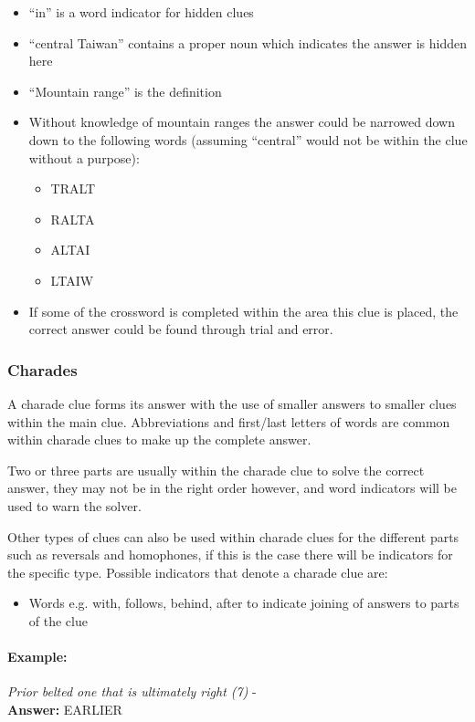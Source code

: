 \begin{itemize}
  \item ``in'' is a word indicator for hidden clues 
  \item ``central Taiwan'' contains a proper noun which indicates the answer 
        is hidden here 
  \item ``Mountain range'' is the definition 
  \item Without knowledge of mountain ranges the answer could be narrowed down
        down to the following words (assuming ``central'' would not be within 
        the clue without a purpose):
  \begin{itemize}
    \item TRALT 
    \item RALTA 
    \item ALTAI 
    \item LTAIW
  \end{itemize} 
  \item If some of the crossword is completed within the area this clue is 
        placed, the correct answer could be found through trial and error.
\end{itemize}


\subsubsection{Charades}

A charade clue forms its answer with the use of smaller answers to smaller clues
within the main clue. Abbreviations and first/last letters of words are common
within charade clues to make up the complete answer.

Two or three parts are usually within the charade clue to solve the correct
answer, they may not be in the right order however, and word indicators will be
used to warn the solver. 

Other types of clues can also be used within charade clues for the different
parts such as reversals and homophones, if this is the case there will be
indicators for the specific type. Possible  indicators that denote a charade
clue are:

\begin{itemize}
  \item Words e.g. with, follows, behind, after to indicate joining of answers 
        to parts of the clue 
\end{itemize}

\paragraph{Example:} \emph{Prior belted one that is ultimately right (7)} - \citep{shuchiCharades08} \\
\textbf{Answer:} EARLIER

